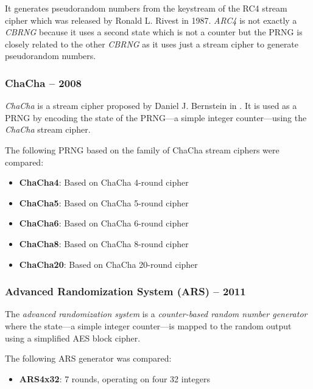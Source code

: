     It generates pseudorandom numbers from the keystream of the RC4 stream cipher which was released by Ronald L. Rivest in 1987. \emph{ARC4} is not exactly a \emph{CBRNG} because it uses a second state which is not a counter but the PRNG is closely related to the other \emph{CBRNG} as it uses just a stream cipher to generate pseudorandom numbers.

\subsubsection[ChaCha -- 2008]{ChaCha -- 2008} \label{subsubsec:chacha}

    \emph{ChaCha} is a stream cipher proposed by Daniel J. Bernstein in \cite{Bernstein:2008}. It is used as a PRNG by encoding the state of the PRNG---a simple integer counter---using the \emph{ChaCha} stream cipher.

    The following PRNG based on the family of ChaCha stream ciphers were compared:
    \begin{itemize}
        \itemsep0em
        \item \textbf{ChaCha4}: Based on ChaCha 4-round cipher
        \item \textbf{ChaCha5}: Based on ChaCha 5-round cipher
        \item \textbf{ChaCha6}: Based on ChaCha 6-round cipher
        \item \textbf{ChaCha8}: Based on ChaCha 8-round cipher
        \item \textbf{ChaCha20}: Based on ChaCha 20-round cipher
    \end{itemize}

\subsubsection[Advanced Randomization System (ARS) -- 2011]{Advanced Randomization System (ARS) -- 2011} \label{subsubsec:ars}

    The \emph{advanced randomization system} is a \emph{counter-based random number generator} where the state---a simple integer counter---is mapped to the random output using a simplified AES block cipher.

    The following ARS generator was compared:
    \begin{itemize}
		\itemsep0em
        \item \textbf{ARS4x32}: 7 rounds, operating on four \SI{32}{\bit} integers
    \end{itemize}

